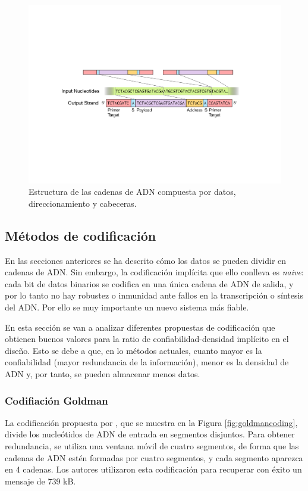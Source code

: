 \documentclass[a4paper,11pt]{article}
\begin{document}
\begin{figure}[h!]
\begin{center}
\includegraphics[width=0.82\linewidth]{data-format.pdf}
\caption{Estructura de las cadenas de ADN compuesta por datos, direccionamiento y cabeceras.}
\label{fig:dataformat}
\end{center}
\end{figure}

\subsection{Métodos de codificación}

En las secciones anteriores se ha descrito cómo los datos se pueden dividir en cadenas de ADN. Sin embargo, la codificación implícita que ello conlleva es \textit{naive}: cada bit de datos binarios se codifica en una única cadena de ADN de salida, y por lo tanto no hay robustez o inmunidad ante fallos en la transcripción o síntesis del ADN. Por ello se muy importante un nuevo sistema más fiable. 

En esta sección se van a analizar diferentes propuestas de codificación que obtienen buenos valores para la ratio de confiabilidad-densidad implícito en el diseño. Esto se debe a que, en lo métodos actuales, cuanto mayor es la confiabilidad (mayor redundancia de la información), menor es la densidad de ADN y, por tanto, se pueden almacenar menos datos.


\subsubsection{Codifiación Goldman}

La codificación propuesta por \citep{Goldman2013}, que se muestra en la Figura \ref{fig:goldmancoding}, divide los nucleótidos de ADN de entrada en segmentos disjuntos. Para obtener redundancia, se utiliza una ventana móvil de cuatro segmentos, de forma que las cadenas de ADN estén formadas por cuatro segmentos, y cada segmento aparezca en 4 cadenas. Los autores utilizaron esta codificación para recuperar con éxito un mensaje de 739 kB.
\end{document}
